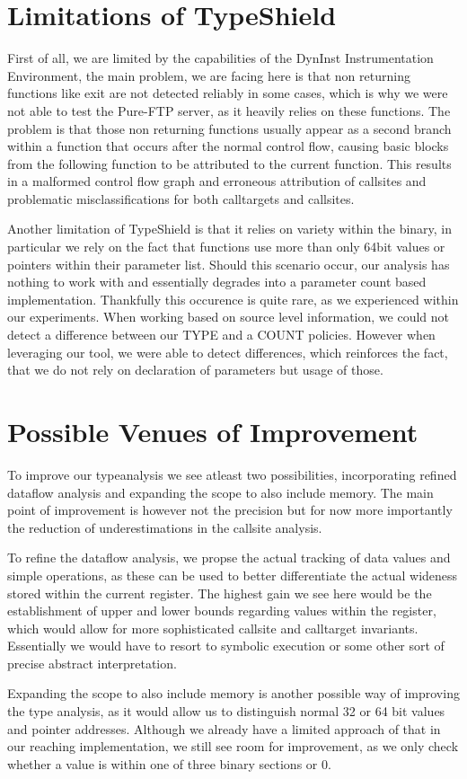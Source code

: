 \section{Limitations of TypeShield}
First of all, we are limited by the capabilities of the DynInst Instrumentation Environment, the main problem, we are facing here is that non returning functions like exit are not detected reliably in some cases, which is why we were not able to test the Pure-FTP server, as it heavily relies on these functions. The problem is that those non returning functions usually appear as a second branch within a function that occurs after the normal control flow, causing basic blocks from the following function to be attributed to the current function. This results in a malformed control flow graph and erroneous attribution of callsites and problematic misclassifications for both calltargets and callsites.

Another limitation of TypeShield is that it relies on variety within the binary, in particular we rely on the fact that functions use more than only 64bit values or pointers within their parameter list. Should this scenario occur, our analysis has nothing to work with and essentially degrades into a parameter count based implementation. Thankfully this occurence is quite rare, as we experienced within our experiments. When working based on source level information, we could not detect a difference between our TYPE and a COUNT policies. However when leveraging our tool, we were able to detect differences, which reinforces the fact, that we do not rely on declaration of parameters but usage of those.


\section{Possible Venues of Improvement}
To improve our typeanalysis we see atleast two possibilities, incorporating refined dataflow analysis and expanding the scope to also include memory. The main point of improvement is however not the precision but for now more importantly the reduction of underestimations in the callsite analysis.

To refine the dataflow analysis, we propse the actual tracking of data values and simple operations, as these can be used to better differentiate the actual wideness stored within the current register. The highest gain we see here would be the establishment of upper and lower bounds regarding values within the register, which would allow for more sophisticated callsite and calltarget invariants. Essentially we would have to resort to symbolic execution or some other sort of precise abstract interpretation.

Expanding the scope to also include memory is another possible way of improving the type analysis, as it would allow us to distinguish normal 32 or 64 bit values and pointer addresses. Although we already have a limited approach of that in our reaching implementation, we still see room for improvement, as we only check whether a value is within one of three binary sections or 0.
